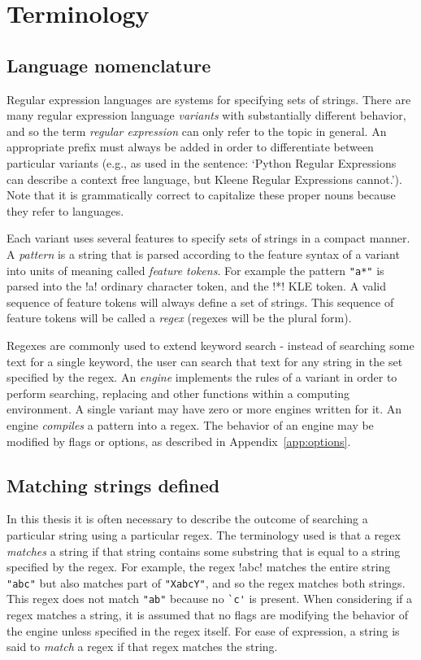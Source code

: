 \section{Terminology}

\subsection{Language nomenclature}
\label{sec:nomenclature}
Regular expression languages are systems for specifying sets of strings.  There are many regular expression language \emph{variants} with substantially different behavior, and so the term \emph{regular expression} can only refer to the topic in general.  An appropriate prefix must always be added in order to differentiate between particular variants (e.g., as used in the sentence:  `Python Regular Expressions can describe a context free language, but Kleene Regular Expressions cannot.').  Note that it is grammatically correct to capitalize these proper nouns because they refer to languages.

Each variant uses several features to specify sets of strings in a compact manner.  A \emph{pattern} is a string that is parsed according to the feature syntax of a variant into units of meaning called \emph{feature tokens}.  For example the pattern \verb!"a*"! is parsed into the \fverb!a! ordinary character token, and the \fverb!*! KLE token.  A valid sequence of feature tokens will always define a set of strings.  This sequence of feature tokens will be called a \emph{regex} (regexes will be the plural form).

Regexes are commonly used to extend keyword search - instead of searching some text for a single keyword, the user can search that text for any string in the set specified by the regex.   An \emph{engine} implements the rules of a variant in order to perform searching, replacing and other functions within a computing environment.  A single variant may have zero or more engines written for it.  An engine \emph{compiles} a pattern into a regex.  The behavior of an engine may be modified by flags or options, as described in Appendix~\ref{app:options}.

\subsection{Matching strings defined}
\label{sec:matchingDefined}
In this thesis it is often necessary to describe the outcome of searching a particular string using a particular regex.  The terminology used is that a regex \emph{matches} a string if that string contains some substring that is equal to a string specified by the regex.  For example, the regex \cverb!abc! matches the entire string \verb!"abc"! but also matches part of \verb!"XabcY"!, and so the regex matches both strings.  This regex does not match \verb!"ab"! because no \verb!`c'! is present.  When considering if a regex matches a string, it is assumed that no flags are modifying the behavior of the engine unless specified in the regex itself.  For ease of expression, a string is said to \emph{match} a regex if that regex matches the string.

